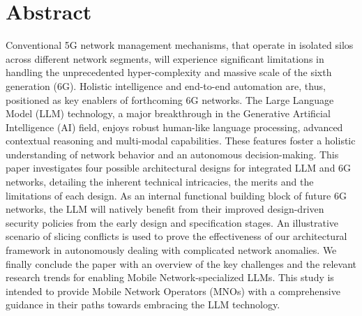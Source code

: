 \section*{Abstract}
\label{sec:abstract}
Conventional 5G network management mechanisms, that operate in isolated silos across different network segments, will experience significant limitations in handling the unprecedented hyper-complexity and massive scale of the sixth generation (6G). Holistic intelligence and end-to-end automation are, thus, positioned as key enablers of forthcoming 6G networks. The Large Language Model (LLM) technology, a major breakthrough in the Generative Artificial Intelligence (AI) field, enjoys robust human-like language processing, advanced contextual reasoning and multi-modal capabilities. These features foster a holistic understanding of network behavior and an autonomous decision-making. This paper investigates four possible architectural designs for integrated LLM and 6G networks, detailing the inherent technical intricacies, the merits and the limitations of each design. As an internal functional building block of future 6G networks, the LLM will natively benefit from their improved design-driven security policies from the early design and specification stages. An illustrative scenario of slicing conflicts is used to prove the effectiveness of our architectural framework in autonomously dealing with complicated network anomalies. We finally conclude the paper with an overview of the key challenges and the relevant research trends for enabling Mobile Network-specialized LLMs. This study is intended to provide Mobile Network Operators (MNOs) with a comprehensive guidance in their paths towards embracing the LLM technology.
